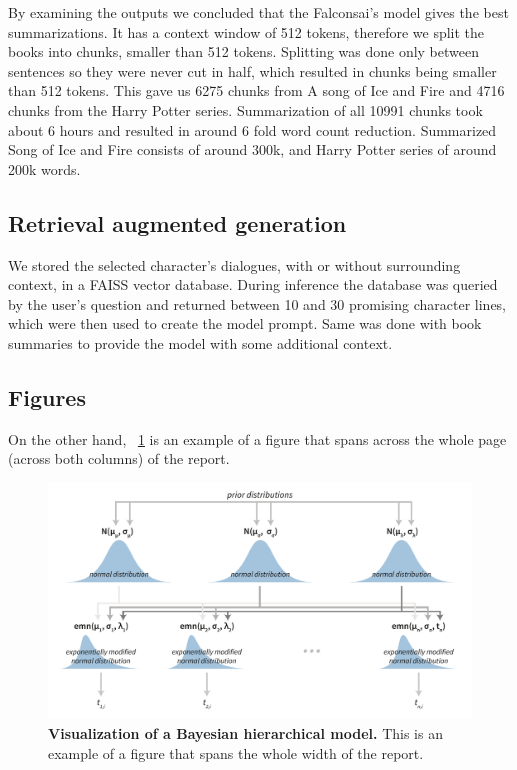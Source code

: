 \documentclass[fleqn,moreauthors,10pt]{ds_report}
\begin{document}
By examining the outputs we concluded that the Falconsai's model gives the best summarizations.
It has a context window of 512 tokens, therefore we split the books into chunks, smaller than 512 tokens.
Splitting was done only between sentences so they were never cut in half, which resulted in chunks being smaller than 512 tokens.
This gave us 6275 chunks from A song of Ice and Fire and 4716 chunks from the Harry Potter series.
Summarization of all 10991 chunks took about 6 hours and resulted in around 6 fold word count reduction. Summarized Song of Ice and Fire consists of around 300k, and Harry Potter series of around 200k words.

\subsection*{Retrieval augmented generation}
We stored the selected character's dialogues, with or without surrounding context, in a FAISS vector database.
During inference the database was queried by the user's question and returned between 10 and 30 promising character lines,
which were then used to create the model prompt.
Same was done with book summaries to provide the model with some additional context.

\subsection*{Figures}

On the other hand, \figurename~\ref{fig:whole} is an example of a figure that spans across the whole page (across both columns) of the report.

\begin{figure}[ht]\centering
	\includegraphics[width=\linewidth]{whole_page.pdf}
	\caption{\textbf{Visualization of a Bayesian hierarchical model.} This is an example of a figure that spans the whole width of the report.}
	\label{fig:whole}
\end{figure}
\end{document}
